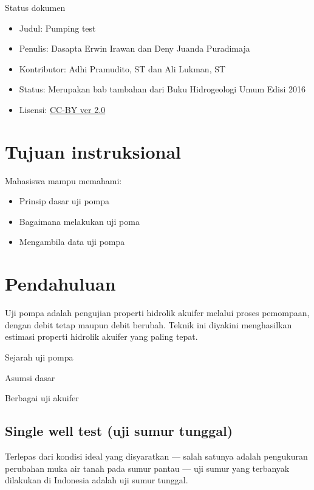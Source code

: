 Status dokumen

\begin{itemize}
\item Judul: Pumping test
\end{itemize}
\begin{itemize}
\item Penulis: Dasapta Erwin Irawan dan Deny Juanda Puradimaja
\end{itemize}
\begin{itemize}
\item Kontributor: Adhi Pramudito, ST dan Ali Lukman, ST
\end{itemize}
\begin{itemize}
\item Status: Merupakan bab tambahan dari Buku Hidrogeologi Umum Edisi 2016
\end{itemize}
\begin{itemize}
\item Lisensi: \href{http://creativecommons.org/licenses/by/2.0/}{CC-BY ver 2.0}
\end{itemize}


\section{Tujuan instruksional} 

Mahasiswa mampu memahami:
\begin{itemize}
\item Prinsip dasar uji pompa
\end{itemize}
\begin{itemize}
\item Bagaimana melakukan uji poma
\end{itemize}
\begin{itemize}
\item Mengambila data uji pompa
\end{itemize}


\section{Pendahuluan}

Uji pompa adalah pengujian properti hidrolik akuifer melalui proses pemompaan, dengan debit tetap maupun debit berubah. Teknik ini diyakini menghasilkan estimasi properti hidrolik akuifer yang paling tepat. 

Sejarah uji pompa


Asumsi dasar


Berbagai uji akuifer


\subsection{Single well test (uji sumur tunggal)}

Terlepas dari kondisi ideal yang disyaratkan — salah satunya adalah pengukuran perubahan muka air tanah pada sumur pantau — uji sumur yang terbanyak dilakukan di Indonesia adalah uji sumur tunggal.  
